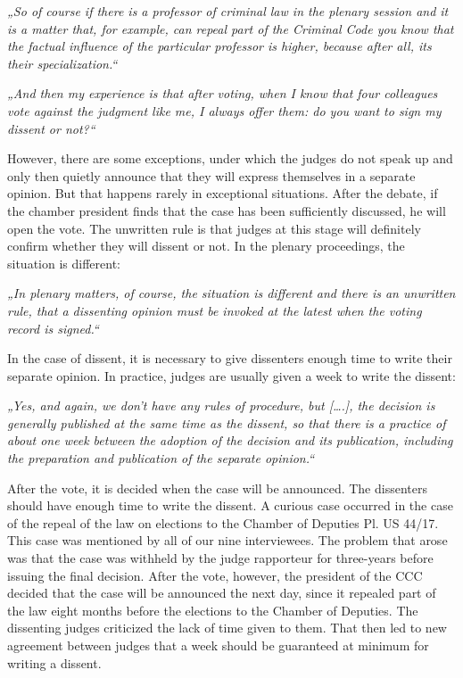\documentclass[
  11pt,
]{article}
\begin{document}
\emph{„So of course if there is a professor of criminal law in the plenary session and it is a matter that, for example, can repeal part of the Criminal Code you know that the factual influence of the particular professor is higher, because after all, its their specialization.``}

\emph{„And then my experience is that after voting, when I know that four colleagues vote against the judgment like me, I always offer them: do you want to sign my dissent or not?{}``}

However, there are some exceptions, under which the judges do not speak up and only then quietly announce that they will express themselves in a separate opinion. But that happens rarely in exceptional situations. After the debate, if the chamber president finds that the case has been sufficiently discussed, he will open the vote. The unwritten rule is that judges at this stage will definitely confirm whether they will dissent or not. In the plenary proceedings, the situation is different:

\emph{„In plenary matters, of course, the situation is different and there is an unwritten rule, that a dissenting opinion must be invoked at the latest when the voting record is signed.``}

In the case of dissent, it is necessary to give dissenters enough time to write their separate opinion. In practice, judges are usually given a week to write the dissent:

\emph{„Yes, and again, we don't have any rules of procedure, but {[}\ldots.{]}, the decision is generally published at the same time as the dissent, so that there is a practice of about one week between the adoption of the decision and its publication, including the preparation and publication of the separate opinion.``}

After the vote, it is decided when the case will be announced. The dissenters should have enough time to write the dissent. A curious case occurred in the case of the repeal of the law on elections to the Chamber of Deputies Pl. US 44/17. This case was mentioned by all of our nine interviewees. The problem that arose was that the case was withheld by the judge rapporteur for three-years before issuing the final decision. After the vote, however, the president of the CCC decided that the case will be announced the next day, since it repealed part of the law eight months before the elections to the Chamber of Deputies. The dissenting judges criticized the lack of time given to them. That then led to new agreement between judges that a week should be guaranteed at minimum for writing a dissent.
\end{document}
